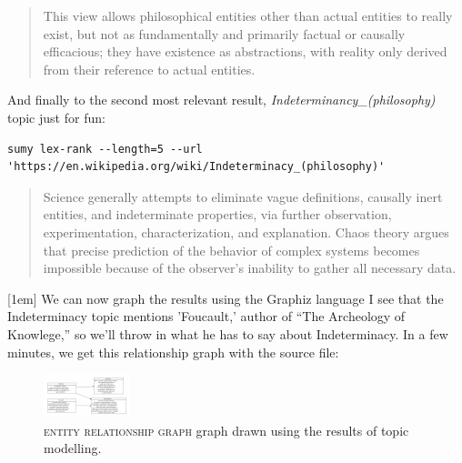 \begin{quote}
This view allows philosophical entities other than actual entities to really exist, but not as fundamentally and primarily factual or causally efficacious; they have existence as abstractions, with reality only derived from their reference to actual entities.
\end{quote}

And finally to the second most relevant result,
\emph{Indeterminancy\_(philosophy)} topic just for fun:
\begin{lstlisting}
sumy lex-rank --length=5 --url 'https://en.wikipedia.org/wiki/Indeterminacy_(philosophy)'
\end{lstlisting}
\begin{quote}
Science generally attempts to eliminate vague definitions, causally inert entities, and indeterminate properties, via further observation, experimentation, characterization, and explanation.
Chaos theory argues that precise prediction of the behavior of complex systems becomes impossible because of the observer's inability to gather all necessary data.
\end{quote}
[1em]
\noindent We can now graph the results using the Graphiz language \textemdash I see that the Indeterminacy topic mentions
'Foucault,' author of ``The Archeology of Knowlege,'' so we'll throw in
what he has to say about Indeterminacy. In a
few minutes, we get this relationship graph with the source file:
\begin{landscape}
\begin{figure}[ht]                                                           
  \centering
  \includegraphics[width=\linewidth]{./media/images/graph}
  \caption{\textsc{entity relationship graph} graph drawn using the results of
    topic modelling.}
  \label{fig:editorial}%
\end{figure}                                                                
\end{landscape}
